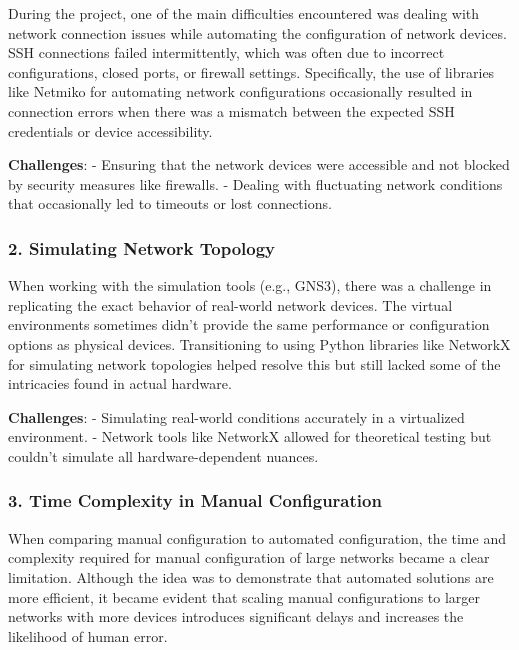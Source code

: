 \documentclass[11pt]{article}
\begin{document}
During the project, one of the main difficulties encountered was dealing
with network connection issues while automating the configuration of
network devices. SSH connections failed intermittently, which was often
due to incorrect configurations, closed ports, or firewall settings.
Specifically, the use of libraries like Netmiko for automating network
configurations occasionally resulted in connection errors when there was
a mismatch between the expected SSH credentials or device accessibility.

\textbf{Challenges}: - Ensuring that the network devices were accessible
and not blocked by security measures like firewalls. - Dealing with
fluctuating network conditions that occasionally led to timeouts or lost
connections.

\hypertarget{simulating-network-topology}{%
\subsubsection{\texorpdfstring{2. \textbf{Simulating Network
Topology}}{2. Simulating Network Topology}}\label{simulating-network-topology}}

When working with the simulation tools (e.g., GNS3), there was a
challenge in replicating the exact behavior of real-world network
devices. The virtual environments sometimes didn't provide the same
performance or configuration options as physical devices. Transitioning
to using Python libraries like NetworkX for simulating network
topologies helped resolve this but still lacked some of the intricacies
found in actual hardware.

\textbf{Challenges}: - Simulating real-world conditions accurately in a
virtualized environment. - Network tools like NetworkX allowed for
theoretical testing but couldn't simulate all hardware-dependent
nuances.

\hypertarget{time-complexity-in-manual-configuration}{%
\subsubsection{\texorpdfstring{3. \textbf{Time Complexity in Manual
Configuration}}{3. Time Complexity in Manual Configuration}}\label{time-complexity-in-manual-configuration}}

When comparing manual configuration to automated configuration, the time
and complexity required for manual configuration of large networks
became a clear limitation. Although the idea was to demonstrate that
automated solutions are more efficient, it became evident that scaling
manual configurations to larger networks with more devices introduces
significant delays and increases the likelihood of human error.
\end{document}
